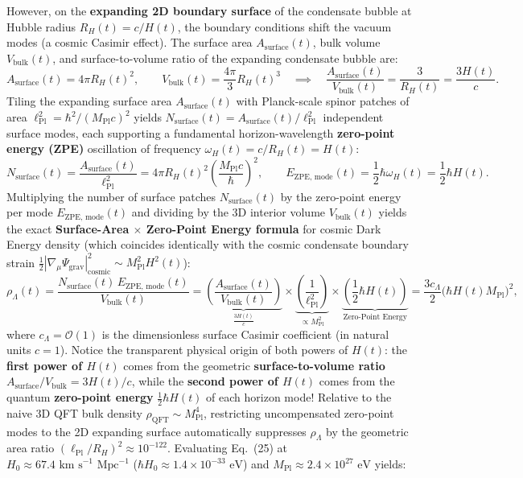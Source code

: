 \documentclass[11pt,a4paper]{article}
\begin{document}
However, on the \textbf{expanding 2D boundary surface} of the condensate bubble at Hubble radius $R_H(t) = c/H(t)$, the boundary conditions shift the vacuum modes (a cosmic Casimir effect). The surface area $A_{\text{surface}}(t)$, bulk volume $V_{\text{bulk}}(t)$, and surface-to-volume ratio of the expanding condensate bubble are:
\begin{equation}
A_{\text{surface}}(t) = 4\pi R_H(t)^2, \qquad V_{\text{bulk}}(t) = \frac{4\pi}{3} R_H(t)^3 \quad \implies \quad \frac{A_{\text{surface}}(t)}{V_{\text{bulk}}(t)} = \frac{3}{R_H(t)} = \frac{3 H(t)}{c}.
\end{equation}
Tiling the expanding surface area $A_{\text{surface}}(t)$ with Planck-scale spinor patches of area $\ell_{\text{Pl}}^2 = \hbar^2 / (M_{\text{Pl}} c)^2$ yields $N_{\text{surface}}(t) = A_{\text{surface}}(t)/\ell_{\text{Pl}}^2$ independent surface modes, each supporting a fundamental horizon-wavelength \textbf{zero-point energy (ZPE)} oscillation of frequency $\omega_H(t) = c/R_H(t) = H(t)$:
\begin{equation}
N_{\text{surface}}(t) = \frac{A_{\text{surface}}(t)}{\ell_{\text{Pl}}^2} = 4\pi R_H(t)^2 \left(\frac{M_{\text{Pl}} c}{\hbar}\right)^2, \qquad E_{\text{ZPE, mode}}(t) = \frac{1}{2}\hbar\omega_H(t) = \frac{1}{2}\hbar H(t).
\end{equation}
Multiplying the number of surface patches $N_{\text{surface}}(t)$ by the zero-point energy per mode $E_{\text{ZPE, mode}}(t)$ and dividing by the 3D interior volume $V_{\text{bulk}}(t)$ yields the exact \textbf{Surface-Area $\times$ Zero-Point Energy formula} for cosmic Dark Energy density (which coincides identically with the cosmic condensate boundary strain $\frac{1}{2}|\nabla_\mu\Psi_{\text{grav}}|_{\text{cosmic}}^2 \sim M_{\text{Pl}}^2 H^2(t)$):
\begin{equation}
\rho_\Lambda(t) = \frac{N_{\text{surface}}(t)\, E_{\text{ZPE, mode}}(t)}{V_{\text{bulk}}(t)} = \underbrace{\left(\frac{A_{\text{surface}}(t)}{V_{\text{bulk}}(t)}\right)}_{\frac{3 H(t)}{c}} \times \underbrace{\left(\frac{1}{\ell_{\text{Pl}}^2}\right)}_{\propto M_{\text{Pl}}^2} \times \underbrace{\left(\frac{1}{2}\hbar H(t)\right)}_{\text{Zero-Point Energy}} = \frac{3 c_\Lambda}{2}\big(\hbar H(t) M_{\text{Pl}}\big)^2,
\end{equation}
where $c_\Lambda = \mathcal{O}(1)$ is the dimensionless surface Casimir coefficient (in natural units $c = 1$). Notice the transparent physical origin of both powers of $H(t)$: the \textbf{first power of $H(t)$} comes from the geometric \textbf{surface-to-volume ratio} $A_{\text{surface}}/V_{\text{bulk}} = 3H(t)/c$, while the \textbf{second power of $H(t)$} comes from the quantum \textbf{zero-point energy} $\frac{1}{2}\hbar H(t)$ of each horizon mode! Relative to the naive 3D QFT bulk density $\rho_{\text{QFT}} \sim M_{\text{Pl}}^4$, restricting uncompensated zero-point modes to the 2D expanding surface automatically suppresses $\rho_\Lambda$ by the geometric area ratio $(\ell_{\text{Pl}}/R_H)^2 \approx 10^{-122}$. Evaluating Eq.\ (25) at $H_0 \approx 67.4\text{ km s}^{-1}\text{ Mpc}^{-1}$ ($\hbar H_0 \approx 1.4 \times 10^{-33}\text{ eV}$) and $M_{\text{Pl}} \approx 2.4 \times 10^{27}\text{ eV}$ yields:
\end{document}
